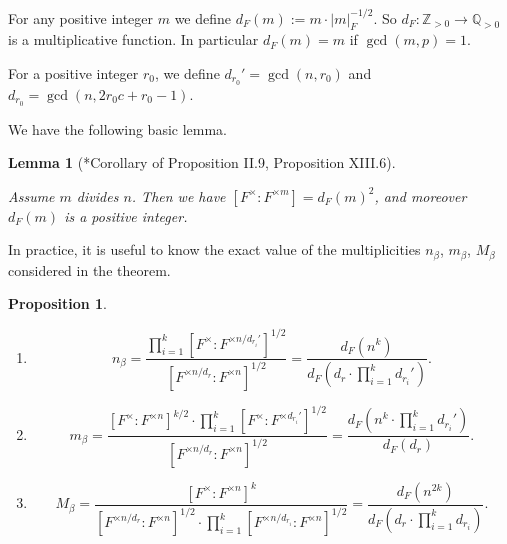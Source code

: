 \documentclass{amsart}
\numberwithin{equation}{section}
\newtheorem{proposition}[theorem]{\bf{Proposition}}
\newtheorem{lemma}[theorem]{\bf{Lemma}}
\newcommand{\abs}[1]{\left|#1\right|_{F}}
\newcommand{\mrgcd}{\operatorname{gcd}}
\newcommand{\mbz}{\mathbb{Z}}
\newcommand{\mbq}{\mathbb{Q}}
\newcommand{\dF}[1]{d_{F}(#1)}
\begin{document}
	For any positive integer $m$ we define $d_{F}(m):=m\cdot\abs{m}^{-1/2}$. So $d_{F}:\mbz_{>0}\rightarrow \mbq_{>0}$ is a multiplicative function. In particular $d_{F}(m)=m$ if $\mrgcd(m,p)=1$. 
	
	For a positive integer $r_{0}$, we define $d_{r_{0}}'=\mrgcd(n,r_{0})$ and $d_{r_{0}}=\mrgcd(n,2r_{0}c+r_{0}-1)$. 
	
	We have the following basic lemma.
	
	\begin{lemma}[\cite{weil1974basic}*{Corollary of Proposition II.9, Proposition XIII.6}]\label{lemmaFmindex}
		
		Assume $m$ divides $n$. Then we have $[F^{\times}:F^{\times m}]=d_{F}(m)^{2}$, and moreover $d_{F}(m)$ is a positive integer.
		
	\end{lemma}
	
	In practice, it is useful to know the exact value of the multiplicities $n_{\beta}$, $m_{\beta}$, $M_{\beta}$ considered in the theorem. 
	
	\begin{proposition}\label{propmulcal}
		
		\begin{enumerate} 
			\item $$n_{\beta}=\frac{\prod_{i=1}^{k}[F^{\times}:F^{\times n/d_{r_{i}}'}]^{1/2}}{[F^{\times n/d_{r}}:F^{\times n}]^{1/2}}=\frac{\dF{n^{k}}}{\dF{d_{r}\cdot\prod_{i=1}^{k}d_{r_{i}}'}}.$$
			
			\item $$m_{\beta}=\frac{[F^{\times}:F^{\times n}]^{k/2}\cdot\prod_{i=1}^{k}[F^{\times}:F^{\times d_{r_{i}}'}]^{1/2}}{[F^{\times n/d_{r}}:F^{\times n}]^{1/2}}=\frac{\dF{n^{k}\cdot\prod_{i=1}^{k}d_{r_{i}}'}}{\dF{d_{r}}}.$$
			
			\item $$M_{\beta}=\frac{[F^{\times}:F^{\times n}]^{k}}{[F^{\times n/d_{r}}:F^{\times n}]^{1/2}\cdot\prod_{i=1}^{k}[F^{\times n/d_{r_{i}}}:F^{\times n}]^{1/2}}=\frac{\dF{n^{2k}}}{\dF{d_{r}\cdot\prod_{i=1}^{k}d_{r_{i}}}}.$$
		\end{enumerate}
		
	\end{proposition}
	
\end{document}
